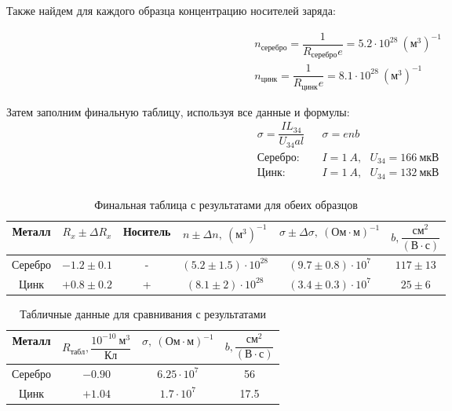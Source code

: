 \documentclass{lab}
\begin{document}
\begin{itemize}
Также найдем для каждого образца концентрацию носителей заряда:

\begin{equation}
\begin{aligned}
	&n_{серебро} = \dfrac{1}{R_{серебро}e} = 5.2 \cdot 10^{28}~(м^{3})^{-1}\\
	&n_{цинк} = \dfrac{1}{R_{цинк}e} = 8.1 \cdot 10^{28}~(м^{3})^{-1}
\end{aligned}
\end{equation}

Затем заполним финальную таблицу, используя все данные и формулы:
\begin{equation}
\begin{aligned}
	&\sigma = \dfrac{IL_{34}}{U_{34}al}	&\sigma = enb\\
	&Серебро: ~~~~~ &I = 1~A, ~~~ U_{34} = 166~мкВ\\
	&Цинк: ~~~~~ 	&I = 1~A, ~~~ U_{34} = 132~мкВ\\
\end{aligned}
\end{equation}
\vspace{-0.5cm}
\begin{table}[H]
	\centering
	\renewcommand{\arraystretch}{2.1}
	\begin{tabular}{|c||c|c|c|c|c|}
		\hline
		Металл	& $ R_x \pm \Delta R_x $	& Носитель	& $ n \pm \Delta n,~(м^{3})^{-1} $	& $ \sigma \pm \Delta \sigma,~(Ом \cdot м)^{-1} $	& $ b, \dfrac{см^2}{(В \cdot с)} $\\ \hline
		Серебро	& $-1.2 \pm 0.1$	& -	& $(5.2 \pm 1.5) \cdot 10^{28}$	&
		$ (9.7 \pm 0.8) \cdot 10^7 $	& $117 \pm 13$ \\ \hline
		Цинк	& $+0.8 \pm 0.2$	& +	& $(8.1 \pm 2) \cdot 10^{28}$	&
		$ (3.4 \pm 0.3) \cdot 10^7 $	& $25 \pm 6$ \\ \hline
	\end{tabular}
	\renewcommand{\arraystretch}{1}
	\caption{\footnotesize Финальная таблица с результатами для обеих образцов}
	\label{tabfinal}
\end{table}
\vspace{-0.5cm}
\begin{table}[H]
	\centering
	\renewcommand{\arraystretch}{2.1}
		\begin{tabular}{|c||c|c|c|}
			\hline
			Металл	& $ R_{табл}, \dfrac{10^{-10}~м^3}{Кл} $	& $ \sigma,~(Ом \cdot м)^{-1} $	& $ b, \dfrac{см^2}{(В \cdot с)} $\\ \hline
			Серебро	& $-0.90$	& $6.25 \cdot 10^7$ & 56 \\ \hline
			Цинк	& $+1.04$	& $1.7 \cdot 10^7$	& 17.5 \\ \hline
		\end{tabular}
	\renewcommand{\arraystretch}{1}
	\caption{\footnotesize Табличные данные для сравнивания с результатами}
	\label{tabl}
\end{table}

\end{itemize}
\end{document}
